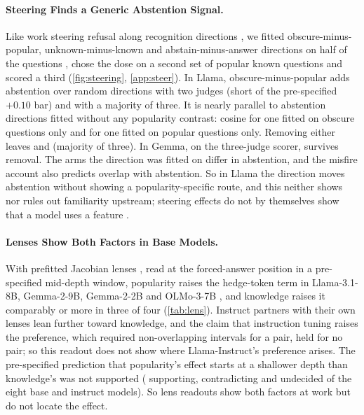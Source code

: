 \documentclass[manuscript,screen,review,anonymous,nonacm]{acmart}
\begin{document}
\paragraph{Steering Finds a Generic Abstention Signal.} Like work steering refusal along recognition directions \cite{ferrando2025iknow,brzezinka2026familiarity}, we fitted obscure-minus-popular, unknown-minus-known and abstain-minus-answer directions on half of the questions \cite{arditi2024refusal,rimsky2024caa}, chose the dose on a second set of popular known questions and scored a third (\cref{fig:steering}, \cref{app:steer}). In Llama, obscure-minus-popular adds \svLlamaDOne{} \svLlamaDOneCI{} abstention over random directions with two judges (short of the pre-specified $+0.10$ bar) and \gaFam{} \gaFamCI{} with a majority of three. It is nearly parallel to abstention directions fitted without any popularity contrast: cosine \wlLlamaCos{} for one fitted on obscure questions only and \gaCos{} for one fitted on popular questions only. Removing either leaves \wlLlamaDTwo{} \wlLlamaDTwoCI{} and \gaPerp{} \gaPerpCI{} (majority of three). In Gemma, on the three-judge scorer, \svGemmaMajDTwo{} \svGemmaMajDTwoCI{} survives removal. The arms the direction was fitted on differ in abstention, and the misfire account also predicts overlap with abstention. So in Llama the direction moves abstention without showing a popularity-specific route, and this neither shows nor rules out familiarity upstream; steering effects do not by themselves show that a model uses a feature \cite{che2026steering}.

\paragraph{Lenses Show Both Factors in Base Models.} With prefitted Jacobian lenses \cite{gurnee2026workspace}, read at the forced-answer position in a pre-specified mid-depth window, popularity raises the hedge-token term in Llama-3.1-8B, Gemma-2-9B, Gemma-2-2B and OLMo-3-7B \cite{olmo3}, and knowledge raises it comparably or more in three of four (\cref{tab:lens}). Instruct partners with their own lenses lean further toward knowledge, and the claim that instruction tuning raises the preference, which required non-overlapping intervals for a pair, held for no pair; so this readout does not show where Llama-Instruct's preference arises. The pre-specified prediction that popularity's effect starts at a shallower depth than knowledge's was not supported (\jlSupports{} supporting, \jlContradicts{} contradicting and \jlUndecided{} undecided of the eight base and instruct models). So lens readouts show both factors at work but do not locate the effect.
\end{document}
